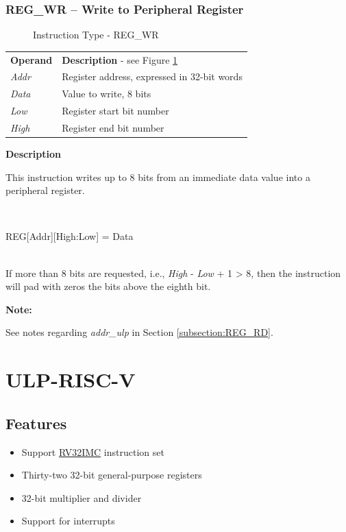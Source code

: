 \documentclass[main\_\_EN.tex]{subfiles}
\begin{document}
\subsubsection{REG\_WR – Write to Peripheral Register} \label{subsection:REG_WR}

%
%
%
%
%
\begin{figure}[!ht ]
    \centering
    \caption{Instruction Type - REG\_WR}
    \label{figure:REG_WR}
\end{figure}


\begin{tabular}{ l l }
\textbf{Operand} & \textbf{Description} - see Figure  \ref{figure:REG_WR} \\
\textit{Addr} & Register address, expressed in 32-bit words \\
\textit{Data} & Value to write, 8 bits \\
\textit{Low} & Register start bit number  \\
\textit{High} & Register end bit number \\
\end{tabular}

\textbf{Description}

This instruction writes up to 8 bits from an immediate data value into a peripheral register.

~
\begin{centering}
    REG[Addr][High:Low] = Data \\
\end{centering}
~\\
If more than 8 bits are requested, i.e., \textit{High} - \textit{Low} + 1 > 8, then the instruction will pad with zeros the bits above the eighth bit.

\textbf{Note:}

See notes regarding \textit{addr\_ulp} in Section \ref{subsection:REG_RD}.

\section{ULP-RISC-V} \label{subsection:PicoRV32}
\subsection{Features}

\begin{itemize}
    \item Support \href{https://riscv.org/specifications/}{RV32IMC} instruction set
    \item Thirty-two 32-bit general-purpose registers
    \item 32-bit multiplier and divider
    \item Support for interrupts
\end{itemize}
\end{document}
